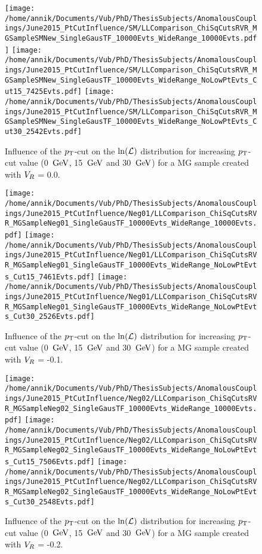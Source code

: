 \begin{figure}[h!t]
 \centering
 \texttt{[image: /home/annik/Documents/Vub/PhD/ThesisSubjects/AnomalousCouplings/June2015\_PtCutInfluence/SM/LLComparison\_ChiSqCutsRVR\_MGSampleSMNew\_SingleGausTF\_10000Evts\_WideRange\_10000Evts.pdf]}
 \texttt{[image: /home/annik/Documents/Vub/PhD/ThesisSubjects/AnomalousCouplings/June2015\_PtCutInfluence/SM/LLComparison\_ChiSqCutsRVR\_MGSampleSMNew\_SingleGausTF\_10000Evts\_WideRange\_NoLowPtEvts\_Cut15\_7425Evts.pdf]}
 \texttt{[image: /home/annik/Documents/Vub/PhD/ThesisSubjects/AnomalousCouplings/June2015\_PtCutInfluence/SM/LLComparison\_ChiSqCutsRVR\_MGSampleSMNew\_SingleGausTF\_10000Evts\_WideRange\_NoLowPtEvts\_Cut30\_2542Evts.pdf]}
 \caption{Influence of the $p_{\textrm T}$-cut on the $\ln(\mathcal{L})$ distribution for increasing $p_{\textrm T}$-cut value (0 $\, \mathrm{GeV}$, 15 $\, \mathrm{GeV}$ and 30 $\, \mathrm{GeV}$) for a MG sample created with $V_{R}$ = 0.0.}
 \label{fig::PtCutInflSM}
\end{figure}

\begin{figure}[h!t]
 \centering
 \texttt{[image: /home/annik/Documents/Vub/PhD/ThesisSubjects/AnomalousCouplings/June2015\_PtCutInfluence/Neg01/LLComparison\_ChiSqCutsRVR\_MGSampleNeg01\_SingleGausTF\_10000Evts\_WideRange\_10000Evts.pdf]}
 \texttt{[image: /home/annik/Documents/Vub/PhD/ThesisSubjects/AnomalousCouplings/June2015\_PtCutInfluence/Neg01/LLComparison\_ChiSqCutsRVR\_MGSampleNeg01\_SingleGausTF\_10000Evts\_WideRange\_NoLowPtEvts\_Cut15\_7461Evts.pdf]}
 \texttt{[image: /home/annik/Documents/Vub/PhD/ThesisSubjects/AnomalousCouplings/June2015\_PtCutInfluence/Neg01/LLComparison\_ChiSqCutsRVR\_MGSampleNeg01\_SingleGausTF\_10000Evts\_WideRange\_NoLowPtEvts\_Cut30\_2526Evts.pdf]}
 \caption{Influence of the $p_{\textrm T}$-cut on the $\ln(\mathcal{L})$ distribution for increasing $p_{\textrm T}$-cut value (0 $\, \mathrm{GeV}$, 15 $\, \mathrm{GeV}$ and 30 $\, \mathrm{GeV}$) for a MG sample created with $V_{R}$ = -0.1.}
 \label{fig::PtCutInflNeg01}
\end{figure}

\begin{figure}[h!t]
 \centering
 \texttt{[image: /home/annik/Documents/Vub/PhD/ThesisSubjects/AnomalousCouplings/June2015\_PtCutInfluence/Neg02/LLComparison\_ChiSqCutsRVR\_MGSampleNeg02\_SingleGausTF\_10000Evts\_WideRange\_10000Evts.pdf]}
 \texttt{[image: /home/annik/Documents/Vub/PhD/ThesisSubjects/AnomalousCouplings/June2015\_PtCutInfluence/Neg02/LLComparison\_ChiSqCutsRVR\_MGSampleNeg02\_SingleGausTF\_10000Evts\_WideRange\_NoLowPtEvts\_Cut15\_7506Evts.pdf]}
 \texttt{[image: /home/annik/Documents/Vub/PhD/ThesisSubjects/AnomalousCouplings/June2015\_PtCutInfluence/Neg02/LLComparison\_ChiSqCutsRVR\_MGSampleNeg02\_SingleGausTF\_10000Evts\_WideRange\_NoLowPtEvts\_Cut30\_2548Evts.pdf]}
 \caption{Influence of the $p_{\textrm T}$-cut on the $\ln(\mathcal{L})$ distribution for increasing $p_{\textrm T}$-cut value (0 $\, \mathrm{GeV}$, 15 $\, \mathrm{GeV}$ and 30 $\, \mathrm{GeV}$) for a MG sample created with $V_{R}$ = -0.2.}
 \label{fig::PtCutInflNeg02}
\end{figure}

